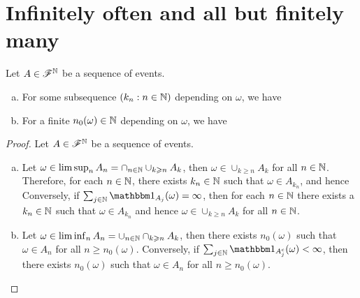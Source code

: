 \documentclass[letterpaper,10pt,english]{article}
\begin{document}
\section{Infinitely often and all but finitely many}
\begin{lem}
Let $A \in \mathscr{F}^{\mathbb{N}}$ be a sequence of events. 
\begin{enumerate}[(a)]
\item For some subsequence $(k_n: n \in \mathbb{N})$ depending on $\omega$, we have 
\item For a finite $n_0(\omega) \in \mathbb{N}$ depending on $\omega$, we have 
\end{enumerate}
\end{lem}
\begin{proof} 
Let $A \in \mathscr{F}^{\mathbb{N}}$ be a sequence of events. 
\begin{enumerate}[(a)]
\item Let $\omega \in \lim\sup_nA_n = \cap_{n \in \mathbb{N}}\cup_{k \geqslant n}A_k$, then $\omega \in \cup_{k \ge n}A_k$ for all $n \in \mathbb{N}$. 
Therefore, for each $n \in \mathbb{N}$, there exists $k_n \in \mathbb{N}$ such that $\omega \in A_{k_n}$, and hence  
Conversely, if $\sum_{j  \in \N}\Ind{A_j}(\omega) = \infty$, then for each $n \in \mathbb{N}$ there exists a $k_n \in \mathbb{N}$ such that $\omega \in A_{k_n}$ and hence $\omega \in \cup_{k \ge n}A_k$ for all $n \in \mathbb{N}$.

\item Let $\omega\in \lim\inf_nA_n = \cup_{n\in\mathbb{N}}\cap_{k\geqslant n}A_k$, then there exists $n_0(\omega)$ such that $\omega \in A_n$ for all $n \ge n_0(\omega)$. 
Conversely, if $\sum_{j  \in \N}\Ind{A_j^c}(\omega) < \infty$, then there exists $n_0(\omega)$ such that $\omega \in A_n$ for all $n \ge n_0(\omega)$.
\end{enumerate}
\end{proof}
\end{document}
